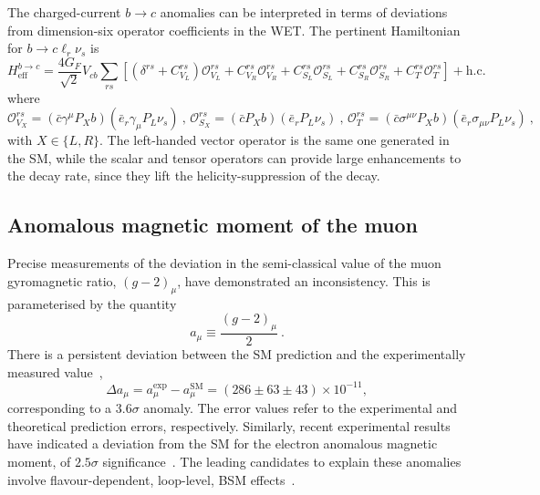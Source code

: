 The charged-current $b \to c$ anomalies can be interpreted in terms of
deviations from dimension-six operator coefficients in the WET. The pertinent
Hamiltonian for $b \to c \ell_{r} \nu_{s}$ is
\begin{equation}
  \label{eq:bctaunu-ham}
  H^{b\to c}_{\text{eff}} = \frac{4 G_{F}}{\sqrt{2}} V_{cb} \sum_{rs} [(\delta^{rs} + C^{rs}_{V_{L}}) \mathcal{O}^{rs}_{V_{L}} + C_{V_{R}}^{rs} \mathcal{O}^{rs}_{V_{R}} + C^{rs}_{S_{L}}\mathcal{O}^{rs}_{S_{L}} + C^{rs}_{S_{R}}\mathcal{O}^{rs}_{S_{R}} + C^{rs}_{T}\mathcal{O}^{rs}_{T}] + \text{h.c.}
\end{equation}
where
\begin{equation}
    \mathcal{O}^{rs}_{V_{X}} = (\bar{c} \gamma^{\mu} P_{X} b) (\bar{e}_{r} \gamma_{\mu} P_{L} \nu_{s}) \ , \, \mathcal{O}^{rs}_{S_{X}} = (\bar{c} P_{X} b) (\bar{e}_{r} P_{L} \nu_{s}) \ , \, \mathcal{O}^{rs}_{T} = (\bar{c} \sigma^{\mu\nu} P_{X} b) (\bar{e}_{r} \sigma_{\mu\nu} P_{L} \nu_{s}) \ ,
\end{equation}
with $X \in \{L, R\}$. The left-handed vector operator is the same one generated
in the SM, while the scalar and tensor operators can provide large enhancements
to the decay rate, since they lift the helicity-suppression of the decay.


\subsection{Anomalous magnetic moment of the muon}

Precise measurements of the deviation in the semi-classical value of the muon
gyromagnetic ratio, $(g-2)_{\mu}$, have demonstrated an inconsistency. This is
parameterised by the quantity
\begin{equation}
  a_{\mu} \equiv \frac{(g-2)_{\mu}}{2} \ .
\end{equation}
There is a persistent deviation between the SM prediction and the experimentally
measured value~\cite{Chapelain:2017syu, Blum:2013xva},
\begin{equation}
\Delta a_\mu= a_\mu^{\text{exp}} - a_\mu^{\text{SM}}= (286\pm63\pm 43) \times 10^{-11},
\end{equation}
corresponding to a $3.6\sigma$ anomaly. The error values refer to the
experimental and theoretical prediction errors, respectively. Similarly, recent
experimental results have indicated a deviation from the SM for the electron
anomalous magnetic moment, of $2.5\sigma$ significance~\cite{articleParker}. The
leading candidates to explain these anomalies involve flavour-dependent,
loop-level, BSM effects~\cite{Blum:2013xva}.

